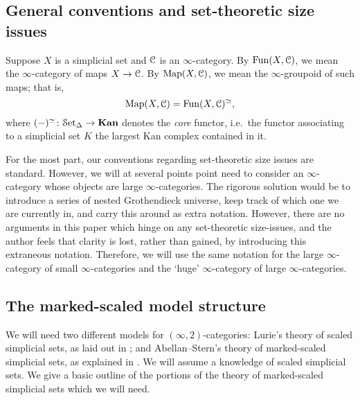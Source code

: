 \documentclass[main.tex]{subfiles}
\begin{document}
\subsection{General conventions and set-theoretic size issues}
\label{ssc:general_conventions}

Suppose $X$ is a simplicial set and $\mathcal{C}$ is an $\infty$-category. By $\mathrm{Fun}(X, \mathcal{C})$, we mean the $\infty$-category of maps $X \to \mathcal{C}$. By $\mathrm{Map}(X, \mathcal{C})$, we mean the $\infty$-groupoid of such maps; that is,
\begin{equation*}
  \mathrm{Map}(X, \mathcal{C}) = \mathrm{Fun}(X, \mathcal{C})^{\simeq},
\end{equation*}
where $(-)^{\simeq}\colon \mathcal{S}\mathrm{et}_{\Delta} \to \mathbf{Kan}$ denotes the \emph{core} functor, i.e.\ the functor associating to a simplicial set $K$ the largest Kan complex contained in it.

For the most part, our conventions regarding set-theoretic size issues are standard. However, we will at several points point need to consider an $\infty$-category whose objects are large $\infty$-categories. The rigorous solution would be to introduce a series of nested Grothendieck universe, keep track of which one we are currently in, and carry this around as extra notation. However, there are no arguments in this paper which hinge on any set-theoretic size-issues, and the author feels that clarity is lost, rather than gained, by introducing this extraneous notation. Therefore, we will use the same notation for the large $\infty$-category of small $\infty$-categories and the `huge' $\infty$-category of large $\infty$-categories.

\subsection{The marked-scaled model structure}
\label{ssc:marked-scaled_model_structure}

We will need two different models for $(\infty,2)$-categories: Lurie's theory of scaled simplicial sets, as laid out in \cite{lurie2009infinity}; and Abellan--Stern's theory of marked-scaled simplicial sets, as explained in \cite{garcia2cartesianfibrationsii}. We will assume a knowledge of scaled simplicial sets. We give a basic outline of the portions of the theory of marked-scaled simplicial sets which we will need.
\end{document}
